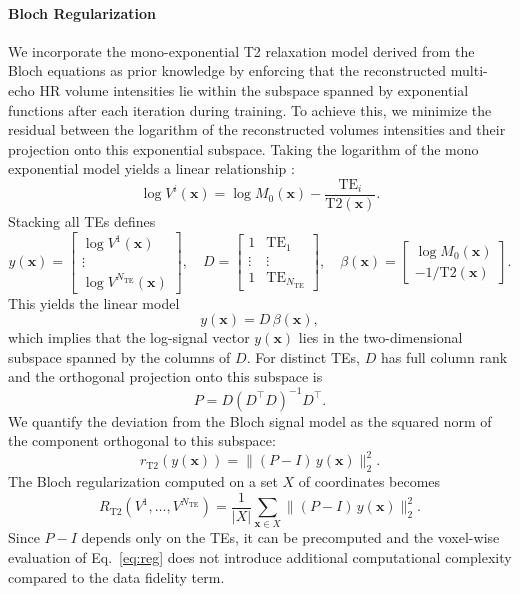 \documentclass[preprint,authoryear,12pt]{elsarticle}
\begin{document}
\paragraph{Bloch Regularization}
We incorporate the mono-exponential T2 relaxation model derived from the Bloch equations as prior knowledge by enforcing that the reconstructed multi-echo HR volume intensities lie within the subspace spanned by exponential functions after each iteration during training. To achieve this, we minimize the residual between the logarithm of the reconstructed volumes intensities and their projection onto this exponential subspace. Taking the logarithm of the mono exponential model yields a linear relationship :
\[
\log V^{i}(\mathbf{x})
=
\log M_0(\mathbf{x})
-
\frac{\mathrm{TE}_i}{\mathrm{T2}(\mathbf{x})}.
\]
Stacking all TEs defines
\[
y(\mathbf{x}) =
\begin{bmatrix}
\log V^{1}(\mathbf{x}) \\
\vdots \\
\log V^{N_{\mathrm{TE}}}(\mathbf{x})
\end{bmatrix},
\quad
D =
\begin{bmatrix}
1 & \mathrm{TE}_1 \\
\vdots & \vdots \\
1 & \mathrm{TE}_{N_{\mathrm{TE}}}
\end{bmatrix},
\quad
\beta(\mathbf{x}) =
\begin{bmatrix}
\log M_0(\mathbf{x}) \\
-1/\mathrm{T2}(\mathbf{x})
\end{bmatrix}.
\]
This yields the linear model
\[
y(\mathbf{x}) = D\,\beta(\mathbf{x}),
\]
which implies that the log-signal vector $y(\mathbf{x})$ lies in the two-dimensional subspace spanned by the columns of $D$. For distinct TEs, $D$ has full column rank and the orthogonal projection onto this subspace is
\[
P = D(D^\top D)^{-1}D^\top.\]
We quantify the deviation from the Bloch signal model as the squared norm of the component orthogonal to this subspace:
\[
r_{\mathrm{T2}}(y(\mathbf{x})) =
\| (P-I)\,y(\mathbf{x}) \|_2^2.
\]
The Bloch regularization computed on a set $X$ of coordinates becomes
\begin{equation}
R_{\mathrm{T2}}(V^1,\dots,V^{N_{\mathrm{TE}}})
=
\frac{1}{|X|}
\sum_{\mathbf{x}\in X}
\|(P-I)\,y(\mathbf{x})\|_2^2.
\label{eq:reg}
\end{equation}
Since $P-I$ depends only on the TEs, it can be precomputed and the voxel-wise evaluation of Eq.~\eqref{eq:reg} does not introduce additional computational complexity compared to the data fidelity term.
\end{document}
